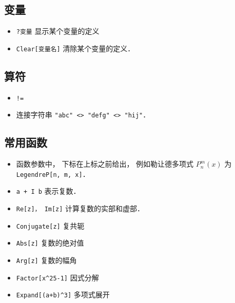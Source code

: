 \subsection{变量}
\begin{itemize}
\item \verb|?变量| 显示某个变量的定义
\item \verb|Clear[变量名]| 清除某个变量的定义．
\end{itemize}

\subsection{算符}
\begin{itemize}
\item \verb|!=|
\item 连接字符串 \verb|"abc" <> "defg" <> "hij"|．
\end{itemize}

\subsection{常用函数}
\begin{itemize}
\item 函数参数中， 下标在上标之前给出， 例如勒让德多项式 $P_n^m(x)$ 为 \verb|LegendreP[n, m, x]|．
\item \verb|a + I b| 表示复数．
\item \verb|Re[z]， Im[z]| 计算复数的实部和虚部．
\item \verb|Conjugate[z]| 复共轭
\item \verb|Abs[z]| 复数的绝对值
\item \verb|Arg[z]| 复数的幅角
\item \verb|Factor[x^25-1]| 因式分解
\item \verb|Expand[(a+b)^3]| 多项式展开
\end{itemize}
